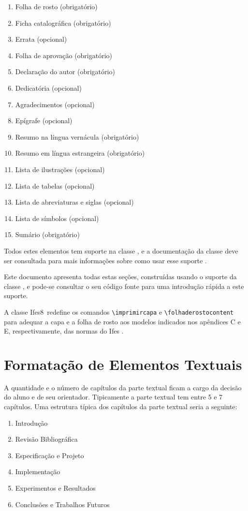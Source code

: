 \documentclass[times,english,brazil,oneside,section=TITLE]{ifes8}
\newcommand{\ifestex}{\textsf{Ifes$8$}}
\begin{document}
\begin{enumerate}
\item Folha de rosto (obrigatório)
\item Ficha catalográfica (obrigatório)
\item Errata (opcional)
\item Folha de aprovação (obrigatório)
\item Declaração do autor (obrigatório)
\item Dedicatória (opcional)
\item Agradecimentos (opcional)
\item Epígrafe (opcional)
\item Resumo na língua vernácula (obrigatório)
\item Resumo em língua estrangeira (obrigatório)
\item Lista de ilustrações (opcional)
\item Lista de tabelas (opcional)
\item Lista de abreviaturas e siglas (opcional)
\item Lista de símbolos (opcional)
\item Sumário (obrigatório)
\end{enumerate}

Todos estes elementos tem suporte na classe \abnTeX, e a documentação
da classe deve ser consultada para mais informações sobre como usar
esse suporte \cite{Araujo2016}.

Este documento apresenta todas estas seções, construídas usando o
suporte da classe \abnTeX, e pode-se consultar o seu código fonte para
uma introdução rápida a este suporte.

A classe \ifestex\ redefine os comandos \verb!\imprimircapa! e
\verb!\folhaderostocontent! para adequar a capa e a folha de rosto aos
modelos indicados nos apêndices C e E, respectivamente, das normas do
Ifes \cite{Ifes2017}.



\chapter{Formatação de Elementos Textuais}
\label{cha:format-text}

A quantidade e o número de capítulos da parte textual ficam a cargo da
decisão do aluno e de seu orientador. Tipicamente a parte textual tem
entre 5 e 7 capítulos. Uma estrutura típica dos capítulos da parte
textual seria a seguinte:

\begin{SingleSpace}
  \begin{enumerate}
  \item Introdução
  \item Revisão Bibliográfica
  \item Especificação e Projeto
  \item Implementação
  \item Experimentos e Resultados
  \item Conclusões e Trabalhos Futuros
  \end{enumerate}
\end{SingleSpace}
\end{document}
